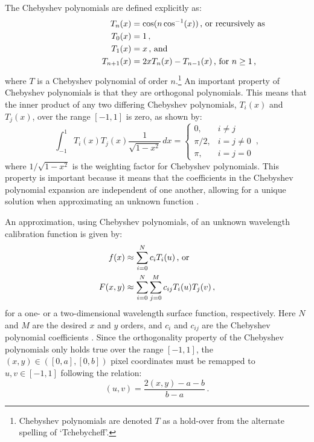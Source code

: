 The Chebyshev polynomials are defined explicitly as:
\begin{align} \label{eq:chebypolyexplicit}
    T_{n}(x) &= \cos(n \cos^{-1}(x)) \rlap{\,,\ \text{or recursively as}}\\
    T_{0}(x) &= 1 \,,\notag\\
    T_{1}(x) &= x \rlap{\,,\ and} \label{eq:chebypoly}\\
    T_{n+1}(x) &= 2xT_n(x) - T_{n-1}(x) \rlap{\,,\ for $n \geq 1$\,,}\notag
\end{align}
where $T$ is a Chebyshev polynomial of order $n$.\footnote{Chebyshev polynomials are denoted $T$ as a hold-over from the alternate spelling of `Tchebycheff'.}
An important property of Chebyshev polynomials is that they are orthogonal polynomials. This means that the inner product of any two differing Chebyshev polynomials, $T_{i}(x)$ and $T_{j}(x)$, over the range $[-1, 1]$ is zero, as shown by:
\begin{equation} \label{eq:chebyorth}
    \int_{-1}^{1} T_{i}(x) T_{j}(x) \frac{1}{\sqrt{1-x^{2}}} \,dx =
    \begin{cases}
        0,       & i \neq j     \\
        \pi / 2, & i = j \neq 0 \\
        \pi,     & i = j = 0
    \end{cases}\,,
\end{equation}
where $1 / \sqrt{1 - x^{2}}$ is the weighting factor for Chebyshev polynomials. This property is important because it means that the coefficients in the Chebyshev polynomial expansion are independent of one another, allowing for a unique solution when approximating an unknown function \citep{numerical_recipes, cheby}.

An approximation, using Chebyshev polynomials, of an unknown wavelength calibration function is given by:
\begin{align} \label{eq:chebyshev}
    f(x) &\approx \sum_{i = 0}^{N}  c_{i} T_{i}(u)\rlap{\,,\ or}\\
    F(x, y) &\approx \sum_{i = 0}^{N} \sum_{j = 0}^{M} c_{ij} T_{i}(u) T_{j}(v)\,,\label{eq:chebyshev2D}
\end{align}
for a one- or a two-dimensional wavelength surface function, respectively. Here $N$ and $M$ are the desired $x$ and $y$ orders, and $c_{i}$ and $c_{ij}$ are the Chebyshev polynomial coefficients \citep{chebysurf, cheby2d}. Since the orthogonality property of the Chebyshev polynomials only holds true over the range $[-1, 1]$, the $(x, y) \in ([0, a], [0, b])$ pixel coordinates must be remapped to $u, v \in [-1, 1]$ following the relation:
\begin{equation} \label{eq:XtoUV}
    (u, v) = \frac{2 (x, y) - a - b}{b - a}\,.
\end{equation}

